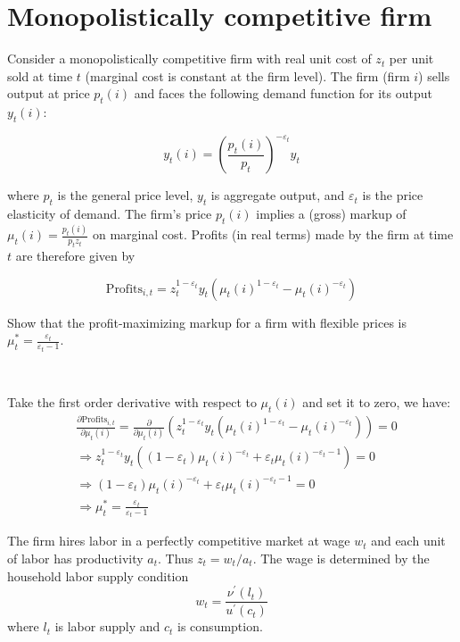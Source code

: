 \section*{Monopolistically competitive firm}
Consider a monopolistically competitive firm with real unit cost of $z_t$ per unit sold at time $t$ (marginal cost is constant at the firm level). The firm (firm $i$) sells output at price $p_t(i)$ and faces the following demand function for its output $y_t(i)$:

\[
y_t(i) = \left(\frac{p_t(i)}{p_t}\right)^{-\varepsilon_t} y_t
\]

where $p_t$ is the general price level, $y_t$ is aggregate output, and $\varepsilon_t$ is the price elasticity of demand. The firm's price $p_t(i)$ implies a (gross) markup of $\mu_t(i) = \frac{p_t(i)}{p_t z_t}$ on marginal cost. Profits (in real terms) made by the firm at time $t$ are therefore given by

\[
\text{Profits}_{i,t} = z_t^{1-\varepsilon_t} y_t \left(\mu_t(i)^{1-\varepsilon_t} - \mu_t(i)^{-\varepsilon_t}\right)
\]

\begin{problem*}[a]
    Show that the profit-maximizing markup for a firm with flexible prices is $\mu_t^* = \frac{\varepsilon_t}{\varepsilon_t - 1}$.
\end{problem*}

\begin{solution}
    \

    Take the first order derivative with respect to $\mu_t(i)$ and set it to zero, we have:
    \begin{align*}
        & \frac{\partial \text{Profits}_{i,t}}{\partial \mu_t(i)} = \frac{\partial}{\partial \mu_t(i)} \left(z_t^{1-\varepsilon_t} y_t \left(\mu_t(i)^{1-\varepsilon_t} - \mu_t(i)^{-\varepsilon_t}\right)\right) = 0 \\
        & \Rightarrow z_t^{1-\varepsilon_t} y_t \left((1-\varepsilon_t) \mu_t(i)^{-\varepsilon_t} + \varepsilon_t \mu_t(i)^{-\varepsilon_t-1} \right) = 0 \\
        & \Rightarrow (1-\varepsilon_t) \mu_t(i)^{-\varepsilon_t} + \varepsilon_t \mu_t(i)^{-\varepsilon_t-1} = 0 \\
        & \Rightarrow \mu_t^* = \frac{\varepsilon_t}{\varepsilon_t - 1}
    \end{align*}
\end{solution}

The firm hires labor in a perfectly competitive market at wage $w_t$ and each unit of labor has
productivity $a_t$. Thus $z_t = w_t/a_t$. The wage is determined by the household labor supply condition
\[w_t = \frac{\nu^{\prime}(l_t)}{u^{\prime} (c_t)}\]
where $l_t$ is labor supply and $c_t$ is consumption.

